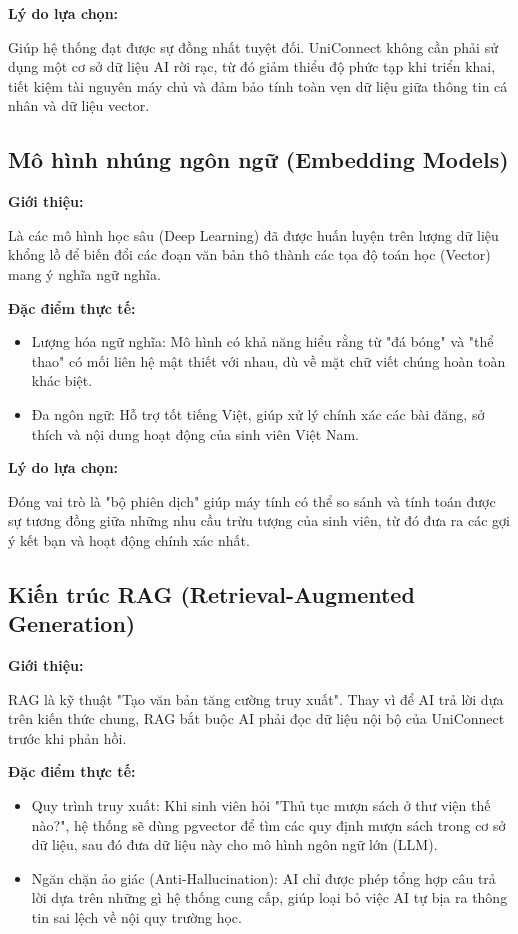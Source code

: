 \textbf{Lý do lựa chọn:} 

Giúp hệ thống đạt được sự đồng nhất tuyệt đối. UniConnect không cần phải sử dụng một cơ sở dữ liệu AI rời rạc, từ đó giảm thiểu độ phức tạp khi triển khai, tiết kiệm tài nguyên máy chủ và đảm bảo tính toàn vẹn dữ liệu giữa thông tin cá nhân và dữ liệu vector.

\subsection{Mô hình nhúng ngôn ngữ (Embedding Models)}

\textbf{Giới thiệu:}

Là các mô hình học sâu (Deep Learning) đã được huấn luyện trên lượng dữ liệu khổng lồ để biến đổi các đoạn văn bản thô thành các tọa độ toán học (Vector) mang ý nghĩa ngữ nghĩa\cite{reimers2019sentence}.

\textbf{Đặc điểm thực tế:} 

\begin{itemize}
    \item Lượng hóa ngữ nghĩa: Mô hình có khả năng hiểu rằng từ "đá bóng" và "thể thao" có mối liên hệ mật thiết với nhau, dù về mặt chữ viết chúng hoàn toàn khác biệt.

    \item Đa ngôn ngữ: Hỗ trợ tốt tiếng Việt, giúp xử lý chính xác các bài đăng, sở thích và nội dung hoạt động của sinh viên Việt Nam.
\end{itemize}

\textbf{Lý do lựa chọn:}

Đóng vai trò là "bộ phiên dịch" giúp máy tính có thể so sánh và tính toán được sự tương đồng giữa những nhu cầu trừu tượng của sinh viên, từ đó đưa ra các gợi ý kết bạn và hoạt động chính xác nhất\cite{lewis2020retrieval}.

\subsection{Kiến trúc RAG (Retrieval-Augmented Generation)}

\textbf{Giới thiệu:} 

RAG là kỹ thuật "Tạo văn bản tăng cường truy xuất". Thay vì để AI trả lời dựa trên kiến thức chung, RAG bắt buộc AI phải đọc dữ liệu nội bộ của UniConnect trước khi phản hồi.

\textbf{Đặc điểm thực tế:}

\begin{itemize}
    \item Quy trình truy xuất: Khi sinh viên hỏi "Thủ tục mượn sách ở thư viện thế nào?", hệ thống sẽ dùng pgvector để tìm các quy định mượn sách trong cơ sở dữ liệu, sau đó đưa dữ liệu này cho mô hình ngôn ngữ lớn (LLM).

    \item Ngăn chặn ảo giác (Anti-Hallucination): AI chỉ được phép tổng hợp câu trả lời dựa trên những gì hệ thống cung cấp, giúp loại bỏ việc AI tự bịa ra thông tin sai lệch về nội quy trường học.
\end{itemize}

